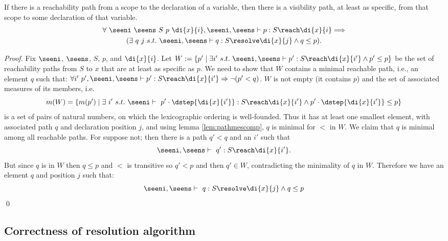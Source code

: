\begin{lemma} \label{lemma:shadowexists}
If there is a reachability path from a scope to the declaration of a variable, then there
is a visibility path, at least as specific, from that scope to some declaration of 
that variable.
\begin{multline*}
\forall\ \seeni\ \seens\ S\ p\ \di{x}{i},
\seeni,\seens \vdash p : S \reach \di{x}{i} \Longrightarrow\\
(\exists\ q\ j\ s.t.\ \seeni,\seens \vdash q : S \resolve \di{x}{j} \wedge q \leq p).
\end{multline*}
\end{lemma}
\begin{proof} Fix $\seeni$, $\seens$, $S$, $p$, and $\di{x}{i}$. Let 
$W := \{ p' \mid \exists i'\ s.t.\ \seeni,\seens \vdash p' : S \reach \di{x}{i'} \wedge p' \le p\}$
be the set of reachability paths from $S$ to $x$ that are at least as specific as $p$. 
We need to show that $W$ contains a minimal reachable path, i.e., an element $q$ such that:
$\forall i'\ p', \seeni,\seens \vdash p' : S \reach \di{x}{i'} \Rightarrow \neg (p' < q)$.
$W$ is not empty (it contains $p$) and the set of associated measures of 
its members, i.e.
\begin{equation*}
 m(W) = \{ m(p') \mid \exists\ i'\ s.t.\ \seeni \vdash\ p'\cdot\dstep{\di{x}{i'}} : S \reach \di{x}{i'} \wedge p'\cdot\dstep{\di{x}{i'}} \le p\}
\end{equation*}
is a set of pairs of natural
numbers, on which the lexicographic ordering is well-founded. Thus it
has at least one smallest element, with associated path $q$ and declaration position $j$, 
and using lemma \ref{lem:pathmescomp}, $q$ is minimal for $<$ in $W$. 
We claim that $q$ is minimal among all reachable paths.
For suppose not; then there is a path $q' < q$ and an $i'$ such that  
\begin{equation*}
  \seeni,\seens \vdash\ q' : S \reach \di{x}{i'}. 
\end{equation*}
But since $q$ is in $W$ then $q \leq p$ and $<$ is transitive so $q' < p$ and then $q' \in W$,
contradicting the minimality of $q$ in $W$.
Therefore we have an element $q$ and position $j$ such that:
\begin{equation*}
  \seeni,\seens \vdash\ q : S \resolve \di{x}{j} \wedge q \le p 
\end{equation*}\qed
\end{proof}

\subsection{Correctness of resolution algorithm}

